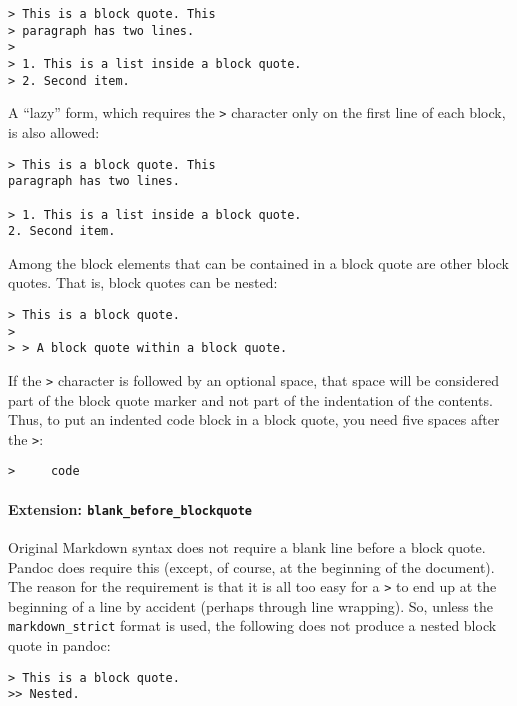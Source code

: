 \documentclass[
]{article}
\begin{document}
\begin{verbatim}
> This is a block quote. This
> paragraph has two lines.
>
> 1. This is a list inside a block quote.
> 2. Second item.
\end{verbatim}

A ``lazy'' form, which requires the \texttt{\textgreater{}} character
only on the first line of each block, is also allowed:

\begin{verbatim}
> This is a block quote. This
paragraph has two lines.

> 1. This is a list inside a block quote.
2. Second item.
\end{verbatim}

Among the block elements that can be contained in a block quote are
other block quotes. That is, block quotes can be nested:

\begin{verbatim}
> This is a block quote.
>
> > A block quote within a block quote.
\end{verbatim}

If the \texttt{\textgreater{}} character is followed by an optional
space, that space will be considered part of the block quote marker and
not part of the indentation of the contents. Thus, to put an indented
code block in a block quote, you need five spaces after the
\texttt{\textgreater{}}:

\begin{verbatim}
>     code
\end{verbatim}

\hypertarget{extension-blank_before_blockquote}{%
\paragraph{\texorpdfstring{Extension:
\texttt{blank\_before\_blockquote}}{Extension: blank\_before\_blockquote}}\label{extension-blank_before_blockquote}}

Original Markdown syntax does not require a blank line before a block
quote. Pandoc does require this (except, of course, at the beginning of
the document). The reason for the requirement is that it is all too easy
for a \texttt{\textgreater{}} to end up at the beginning of a line by
accident (perhaps through line wrapping). So, unless the
\texttt{markdown\_strict} format is used, the following does not produce
a nested block quote in pandoc:

\begin{verbatim}
> This is a block quote.
>> Nested.
\end{verbatim}
\end{document}
